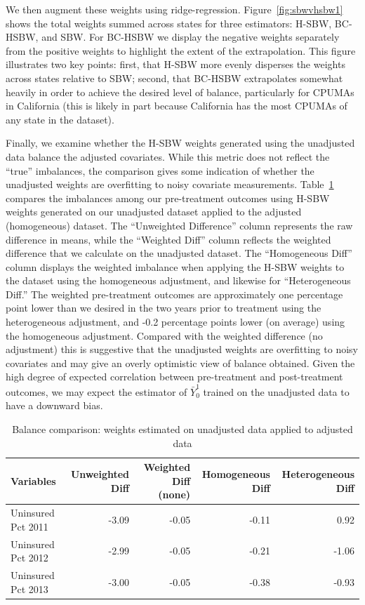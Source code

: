 \documentclass[aoas]{imsart}
\theoremstyle{plain}
\theoremstyle{remark}
\begin{document}
We then augment these weights using ridge-regression. Figure~\ref{fig:sbwvhsbw1} shows the total weights summed across states for three estimators: H-SBW, BC-HSBW, and SBW. For BC-HSBW we display the negative weights separately from the positive weights to highlight the extent of the extrapolation. This figure illustrates two key points: first, that H-SBW more evenly disperses the weights across states relative to SBW; second, that BC-HSBW extrapolates somewhat heavily in order to achieve the desired level of balance, particularly for CPUMAs in California (this is likely in part because California has the most CPUMAs of any state in the dataset).

Finally, we examine whether the H-SBW weights generated using the unadjusted data balance the adjusted covariates. While this metric does not reflect the ``true'' imbalances, the comparison gives some indication of whether the unadjusted weights are overfitting to noisy covariate measurements. Table~\ref{tab:balcomp} compares the imbalances among our pre-treatment outcomes using H-SBW weights generated on our unadjusted dataset applied to the adjusted (homogeneous) dataset. The ``Unweighted Difference'' column represents the raw difference in means, while the ``Weighted Diff'' column reflects the weighted difference that we calculate on the unadjusted dataset. The ``Homogeneous Diff'' column displays the weighted imbalance when applying the H-SBW weights to the dataset using the homogeneous adjustment, and likewise for ``Heterogeneous Diff.'' The weighted pre-treatment outcomes are approximately one percentage point lower than we desired in the two years prior to treatment using the heterogeneous adjustment, and -0.2 percentage points lower (on average) using the homogeneous adjustment. Compared with the weighted difference (no adjustment) this is suggestive that the unadjusted weights are overfitting to noisy covariates and may give an overly optimistic view of balance obtained. Given the high degree of expected correlation between pre-treatment and post-treatment outcomes, we may expect the estimator of $\bar{Y}^1_0$ trained on the unadjusted data to have a downward bias.

\begin{table}[ht]
\caption{Balance comparison: weights estimated on unadjusted data applied to adjusted data}
\label{tab:balcomp}
\begin{tabular}{lrrrr}
  \hline
Variables & Unweighted Diff & Weighted Diff (none) & Homogeneous Diff & Heterogeneous Diff\\ 
  \hline
Uninsured Pct 2011 & -3.09 & -0.05 & -0.11 & 0.92 \\ 
  Uninsured Pct 2012 & -2.99 & -0.05 & -0.21 & -1.06 \\ 
  Uninsured Pct 2013 & -3.00 & -0.05 & -0.38 & -0.93 \\
   \hline
\end{tabular}
\end{table}
\end{document}
